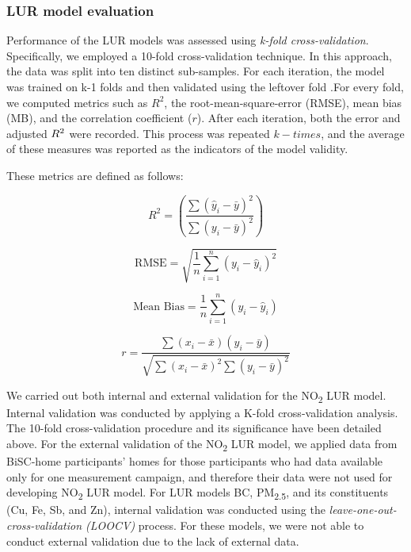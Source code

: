 \documentclass{article}
\begin{document}
\subsubsection{LUR model evaluation}
Performance of the LUR models was assessed using \textit{k-fold cross-validation}. Specifically, we employed a 10-fold cross-validation technique. In this approach, the data was split into ten distinct sub-samples. For each iteration, the model was trained on k-1 folds and then validated using the leftover fold \cite{ziegel2003}.For every fold, we computed metrics such as \(R^2\), the root-mean-square-error (RMSE), mean bias (MB), and the correlation coefficient (\(r\)). After each iteration, both the error and adjusted \(R\textsuperscript{2}\) were recorded. This process was repeated \(k-times\), and the average of these measures was reported as the indicators of the model validity. 
\vspace{0.5cm}

These metrics are defined as follows:

\begin{equation}
R^2 = \left( \frac{\sum (\hat{y}_i - \bar{y})^2}{\sum (y_i - \bar{y})^2} \right)
\end{equation}

\begin{equation}
\text{RMSE} = \sqrt{\frac{1}{n} \sum_{i=1}^{n} (y_i - \hat{y}_i)^2}
\end{equation}

\begin{equation}
\text{Mean Bias} = \frac{1}{n} \sum_{i=1}^{n} (y_i - \hat{y}_i)
\end{equation}

\begin{equation}
r = \frac{\sum (x_i - \bar{x})(y_i - \bar{y})}{\sqrt{\sum (x_i - \bar{x})^2 \sum (y_i - \bar{y})^2}}
\end{equation}
\vspace{0.5 cm}

We carried out both internal and external validation for the NO\textsubscript{2} LUR model. Internal validation was conducted by applying a K-fold cross-validation analysis. The 10-fold cross-validation procedure and its significance have been detailed above. For the external validation of the NO\textsubscript{2} LUR model, we applied data from BiSC-home participants' homes for those participants who had data available only for one measurement campaign, and therefore their data were not used for developing NO\textsubscript{2} LUR model. For LUR models BC, PM\textsubscript{2.5}, and its constituents (Cu, Fe, Sb, and Zn), internal validation was conducted using the \textit{leave-one-out-cross-validation (LOOCV)} process. For these models, we were not able to conduct external validation due to the lack of external data.
\end{document}
